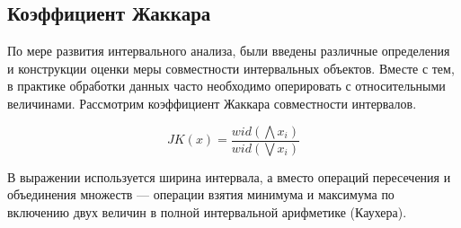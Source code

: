 \subsection{Коэффициент Жаккара}
По мере развития интервального анализа, были введены различные определения и конструкции оценки меры совместности интервальных объектов. Вместе с тем, в практике обработки данных часто необходимо оперировать с относительными величинами. Рассмотрим коэффициент Жаккара совместности интервалов.

\begin{equation}
    JK(x) = \frac{wid(\bigwedge x_i)}{wid(\bigvee x_i)}
\end{equation}

В выражении используется ширина интервала, а вместо операций пересечения и объединения множеств — операции взятия минимума и максимума по включению двух величин в полной интервальной арифметике (Каухера). 
